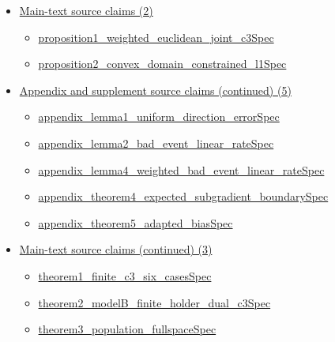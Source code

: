 \documentclass[10pt]{article}
\begin{document}
\begin{itemize}[leftmargin=1.2em]
\begin{itemize}[leftmargin=1.2em]
\item \hyperlink{source-claim-ecf761bbd6bd7ecd}{lemma3\_\allowbreak{}finite\_\allowbreak{}holder\_\allowbreak{}dual\_\allowbreak{}gradient\_\allowbreak{}candidate\_\allowbreak{}norm\_\allowbreak{}formula\allowbreak{}Spec}
\end{itemize}
\item \hyperlink{source-section-0c7af8265958a9ea}{Main-text source claims (2)}
\begin{itemize}[leftmargin=1.2em]
\item \hyperlink{source-claim-807172637313be6b}{proposition1\_\allowbreak{}weighted\_\allowbreak{}euclidean\_\allowbreak{}joint\_\allowbreak{}c3\allowbreak{}Spec}
\item \hyperlink{source-claim-d36270613434ba50}{proposition2\_\allowbreak{}convex\_\allowbreak{}domain\_\allowbreak{}constrained\_\allowbreak{}l1\allowbreak{}Spec}
\end{itemize}
\item \hyperlink{source-section-ff6e74b6c8cd2005}{Appendix and supplement source claims (continued) (5)}
\begin{itemize}[leftmargin=1.2em]
\item \hyperlink{source-claim-e10fc73b582f4351}{appendix\_\allowbreak{}lemma1\_\allowbreak{}uniform\_\allowbreak{}direction\_\allowbreak{}error\allowbreak{}Spec}
\item \hyperlink{source-claim-50059dcbca6a7d66}{appendix\_\allowbreak{}lemma2\_\allowbreak{}bad\_\allowbreak{}event\_\allowbreak{}linear\_\allowbreak{}rate\allowbreak{}Spec}
\item \hyperlink{source-claim-4069888dfd6281a0}{appendix\_\allowbreak{}lemma4\_\allowbreak{}weighted\_\allowbreak{}bad\_\allowbreak{}event\_\allowbreak{}linear\_\allowbreak{}rate\allowbreak{}Spec}
\item \hyperlink{source-claim-4f41e995c4d500c9}{appendix\_\allowbreak{}theorem4\_\allowbreak{}expected\_\allowbreak{}subgradient\_\allowbreak{}boundary\allowbreak{}Spec}
\item \hyperlink{source-claim-f8e78133bd080649}{appendix\_\allowbreak{}theorem5\_\allowbreak{}adapted\_\allowbreak{}bias\allowbreak{}Spec}
\end{itemize}
\item \hyperlink{source-section-c08c7eca66416a2f}{Main-text source claims (continued) (3)}
\begin{itemize}[leftmargin=1.2em]
\item \hyperlink{source-claim-e1093888fe362fdc}{theorem1\_\allowbreak{}finite\_\allowbreak{}c3\_\allowbreak{}six\_\allowbreak{}cases\allowbreak{}Spec}
\item \hyperlink{source-claim-632778126c1e7202}{theorem2\_\allowbreak{}model\allowbreak{}B\_\allowbreak{}finite\_\allowbreak{}holder\_\allowbreak{}dual\_\allowbreak{}c3\allowbreak{}Spec}
\item \hyperlink{source-claim-f197690ced7ff637}{theorem3\_\allowbreak{}population\_\allowbreak{}fullspace\allowbreak{}Spec}
\end{itemize}
\end{itemize}
\end{document}
